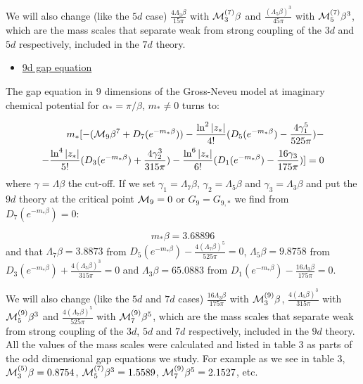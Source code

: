 \documentclass[twoside]{article}
\begin{document}
We will also change (like the $5d$ case) $\frac{4\Lambda_3\beta}{15\pi}$ with ${\cal M}_3^{(7)}\beta$ and $\frac{(\Lambda_5\beta)^3}{45\pi}$ with ${\cal M}_5^{(7)}\beta^3$, which are the mass scales that separate weak from strong coupling of the $3d$ and $5d$ respectively, included in the $7d$ theory. 
 
 \begin{itemize}
 	\item \underline{9d gap equation}
 \end{itemize}
 
The gap equation in 9 dimensions of the Gross-Neveu model at imaginary chemical potential for $\alpha_*=\pi/\beta$, $m_*\not=0$ turns to:

\begin{align}
m_*[-({\cal M}_9\beta^7+D_7(e^{-m_*\beta}))-\frac{\ln^2|z_*|}{4!}(D_5(e^{-m_*\beta})-\frac{4\gamma_1^5}{525\pi})-\\\nonumber
-\frac{\ln^4|z_*|}{5!}(D_3(e^{-m_*\beta})
+\frac{4\gamma_2^3}{315\pi})
-\frac{\ln^6|z_*|}{6!}(D_1(e^{-m_*\beta})-\frac{16\gamma_3}{175\pi})]=0
\end{align}
where $\gamma=\Lambda\beta$ the cut-off. If we set $\gamma_1=\Lambda_7\beta$, $\gamma_2=\Lambda_5\beta$ and $\gamma_3=\Lambda_3\beta$ and put the $9d$ theory at the critical point ${\cal M}_9=0$ or $G_9=G_{9,*}$ we find from $D_7(e^{-m_*\beta})=0$:

\begin{equation}
\boxed
{m_*\beta=3.68896}
\end{equation}
and that $\Lambda_7\beta=3.8873$ from $D_5(e^{-m_*\beta})-\frac{4(\Lambda_7\beta)^5}{525\pi}=0$, $\Lambda_5\beta=9.8758$ from $D_3(e^{-m_*\beta})+\frac{4(\Lambda_5\beta)^3}{315\pi}=0$ and $\Lambda_3\beta=65.0883$ from $D_1(e^{-m_*\beta})-\frac{16\Lambda_3\beta}{175\pi}=0$.

We will also change (like the $5d$ and $7d$ cases) $\frac{16\Lambda_3\beta}{175\pi}$ with ${\cal M}_3^{(9)}\beta$, $\frac{4(\Lambda_5\beta)^3}{315\pi}$ with ${\cal M}_5^{(9)}\beta^3$ and $\frac{4(\Lambda_7\beta)^5}{525\pi}$ with ${\cal M}_7^{(9)}\beta^5$, which are the mass scales that separate weak from strong coupling of the $3d$, $5d$ and $7d$ respectively, included in the $9d$ theory. All the values of the mass scales were calculated and listed in table 3 as parts of the odd dimensional gap equations we study. For example as we see in table 3, ${\cal M}_3^{(5)}\beta=0.8754$, ${\cal M}_5^{(7)}\beta^3=1.5589$, ${\cal M}_7^{(9)}\beta^5=2.1527$, etc.
 
\end{document}
